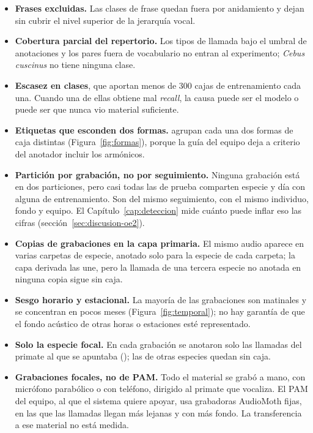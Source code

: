 \begin{itemize}
          fuera del alcance de esta tesis.
    \item \textbf{Frases excluidas.} Las clases de frase quedan fuera por
          anidamiento y dejan sin cubrir el nivel superior de la jerarquía vocal.
    \item \textbf{Cobertura parcial del repertorio.} Los tipos de llamada bajo el
          umbral de \minPairCount{} anotaciones y los \nPairsOutVocab{} pares fuera de
          vocabulario no entran al experimento; \textit{Cebus cuscinus} no tiene
          ninguna clase.
    \item \textbf{Escasez en \nSmallClasses{} clases}, que aportan menos de 300
          cajas de entrenamiento cada una. Cuando una de ellas obtiene mal
          \textit{recall}, la causa puede ser el modelo o puede ser que nunca vio
          material suficiente.
    \item \textbf{Etiquetas que esconden dos formas.} \splitShapes{} agrupan cada
          una dos formas de caja distintas (Figura~\ref{fig:formas}), porque la
          guía del equipo deja a criterio del anotador incluir los armónicos.
    \item \textbf{Partición por grabación, no por seguimiento.} Ninguna grabación
          está en dos particiones, pero casi todas las de prueba comparten especie
          y día con alguna de entrenamiento. Son del mismo seguimiento, con el
          mismo individuo, fondo y equipo. El Capítulo~\ref{cap:deteccion} mide
          cuánto puede inflar eso las cifras (sección~\ref{sec:discusion-oe2}).
    \item \textbf{Copias de grabaciones en la capa primaria.} El mismo audio
          aparece en varias carpetas de especie, anotado solo para la especie de cada
          carpeta; la capa derivada las une, pero la llamada de una tercera especie no
          anotada en ninguna copia sigue sin caja.
    \item \textbf{Sesgo horario y estacional.} La mayoría de las grabaciones son
          matinales y se concentran en pocos meses (Figura~\ref{fig:temporal}); no hay
          garantía de que el fondo acústico de otras horas o estaciones esté
          representado.
    \item \textbf{Solo la especie focal.} En cada grabación se anotaron solo las
          llamadas del primate al que se apuntaba (\cpEquipo); las de otras
          especies quedan sin caja.
    \item \textbf{Grabaciones focales, no de PAM.} Todo el material se grabó a mano, con
          micrófono parabólico o con teléfono, dirigido al primate que vocaliza. El PAM del equipo,
          al que el sistema quiere apoyar, usa grabadoras AudioMoth fijas, en las
          que las llamadas llegan más lejanas y con más fondo. La transferencia a
          ese material no está medida.
\end{itemize}

